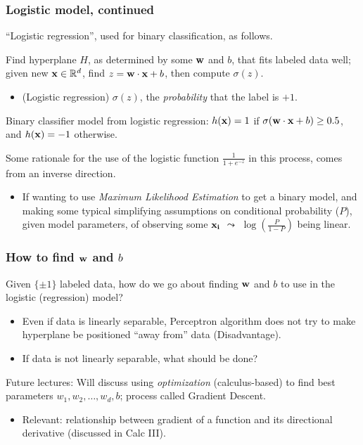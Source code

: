 \documentclass{beamer}
\theoremstyle{example}
\begin{document}
\begin{frame}
\frametitle{Logistic model, continued}
    ``Logistic regression'', used for binary classification, as follows.
    
    Find hyperplane $H$, as determined by some ${\bf w}$ and $b$, that fits labeled data well; given new ${\bf x}\in\mathbb R^d$, find $z = {\bf w}\cdot{\bf x}+b$, then compute $\sigma(z)$. 
    \begin{itemize}
        \item (Logistic regression) $\sigma(z)$, the \textit{probability} that the label is $+1$.
    \end{itemize}
    
    Binary classifier model from logistic regression: $h({\bf x})=1$ if $\sigma({\bf w}\cdot{\bf x}+b) \ge 0.5$, and $h({\bf x})=-1$ otherwise. 
    
    \pause 
    Some rationale for the use of the logistic function $\frac{1}{1+e^{-z}}$ in this process, comes from an inverse direction. 
    \begin{itemize}
        \item If wanting to use \textit{Maximum Likelihood Estimation} to get a binary model, and making some typical simplifying assumptions on conditional probability ($P$), given model parameters, of observing some ${\bf x_i}$ $\leadsto$ $\log\left(\frac{P}{1-P}\right)$ being linear.
    \end{itemize}

\end{frame}
\begin{frame}
    \frametitle{How to find ${\bf w}$ and $b$}
    Given $\{\pm1\}$ labeled data, how do we go about finding ${\bf w}$ and $b$ to use in the logistic (regression) model?

    \pause
    \begin{itemize}
        \item Even if data is linearly separable, Perceptron algorithm does not try to make hyperplane be positioned ``away from'' data (Disadvantage). 
        \item If data is not linearly separable, what should be done?
    \end{itemize}

    \pause
    Future lectures: Will discuss using \emph{optimization} (calculus-based) to find best parameters $w_1,w_2,\ldots,w_d,b$; process called Gradient Descent. 
    \pause
    \begin{itemize}
        \item Relevant: relationship between {gradient} of a function and its {directional derivative} (discussed in Calc III).
    \end{itemize}
\end{frame}
\end{document}

